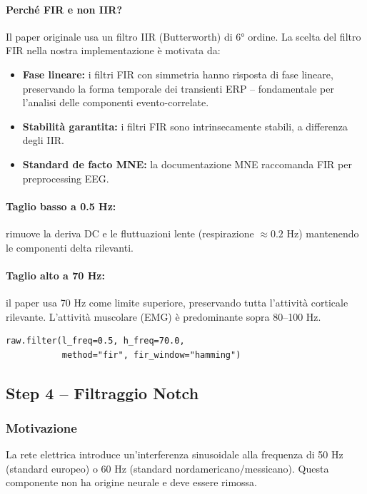 \documentclass[12pt, a4paper]{article}
\begin{document}
\paragraph{Perché FIR e non IIR?}
Il paper originale usa un filtro IIR (Butterworth) di 6° ordine. La scelta del filtro FIR nella nostra implementazione è motivata da:
\begin{itemize}
    \item \textbf{Fase lineare:} i filtri FIR con simmetria hanno risposta di fase lineare, preservando la forma temporale dei transienti ERP -- fondamentale per l'analisi delle componenti evento-correlate.
    \item \textbf{Stabilità garantita:} i filtri FIR sono intrinsecamente stabili, a differenza degli IIR.
    \item \textbf{Standard de facto MNE:} la documentazione MNE raccomanda FIR per preprocessing EEG.
\end{itemize}

\paragraph{Taglio basso a 0.5 Hz:} rimuove la deriva DC e le fluttuazioni lente (respirazione $\approx 0.2$ Hz) mantenendo le componenti delta rilevanti.

\paragraph{Taglio alto a 70 Hz:} il paper usa 70 Hz come limite superiore, preservando tutta l'attività corticale rilevante. L'attività muscolare (EMG) è predominante sopra 80--100 Hz.

\begin{lstlisting}[caption={Filtro bandpass FIR}]
raw.filter(l_freq=0.5, h_freq=70.0,
           method="fir", fir_window="hamming")
\end{lstlisting}

\subsection{Step 4 -- Filtraggio Notch}

\subsubsection{Motivazione}
La rete elettrica introduce un'interferenza sinusoidale alla frequenza di 50 Hz (standard europeo) o 60 Hz (standard nordamericano/messicano). Questa componente non ha origine neurale e deve essere rimossa.
\end{document}
